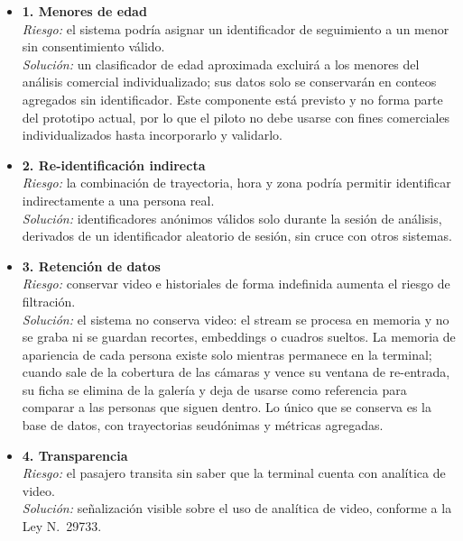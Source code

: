 \documentclass[12pt,letterpaper]{article}
\begin{document}
\begin{itemize}
    \item \textbf{1. Menores de edad} \\
    \textit{Riesgo:} el sistema podría asignar un identificador de
    seguimiento a un menor sin consentimiento válido. \\
    \textit{Solución:} un clasificador de edad aproximada excluirá a los
    menores del análisis comercial individualizado; sus datos solo se
    conservarán en conteos agregados sin identificador. Este componente
    está previsto y no forma parte del prototipo actual, por lo que el
    piloto no debe usarse con fines comerciales individualizados hasta
    incorporarlo y validarlo.

    \item \textbf{2. Re-identificación indirecta} \\
    \textit{Riesgo:} la combinación de trayectoria, hora y zona podría
    permitir identificar indirectamente a una persona real. \\
    \textit{Solución:} identificadores anónimos válidos solo durante la
    sesión de análisis, derivados de un identificador aleatorio de
    sesión, sin cruce con otros sistemas.

    \item \textbf{3. Retención de datos} \\
    \textit{Riesgo:} conservar video e historiales de forma indefinida
    aumenta el riesgo de filtración. \\
    \textit{Solución:} el sistema no conserva video: el stream se
    procesa en memoria y no se graba ni se guardan recortes, embeddings
    o cuadros sueltos. La memoria de apariencia de cada persona existe
    solo mientras permanece en la terminal; cuando sale de la cobertura
    de las cámaras y vence su ventana de re-entrada, su ficha se elimina
    de la galería y deja de usarse como referencia para comparar a las
    personas que siguen dentro. Lo único que se conserva es la base de
    datos, con trayectorias seudónimas y métricas agregadas.

    \item \textbf{4. Transparencia} \\
    \textit{Riesgo:} el pasajero transita sin saber que la terminal
    cuenta con analítica de video. \\
    \textit{Solución:} señalización visible sobre el uso de analítica de
    video, conforme a la Ley N.\textdegree~29733.


\end{itemize}
\end{document}
